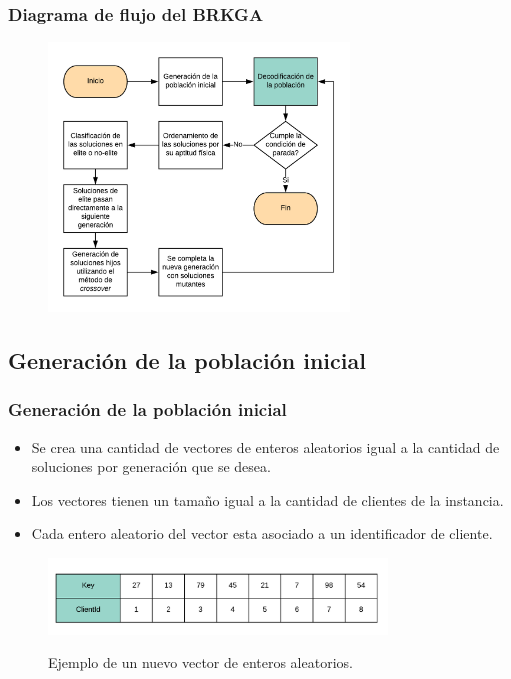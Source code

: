 \documentclass{beamer}
\begin{document}
\begin{frame}
\frametitle{Diagrama de flujo del BRKGA}

\begin{figure}[h]
	\centering
	\includegraphics[width=8cm]{BRKGA_Flow_Chart_Base}
	\label{fig:BRKGA_Flow_Chart_Base}
\end{figure}

\end{frame}


\subsection{Generación de la población inicial}

\begin{frame}
\frametitle{Generación de la población inicial}

\begin{itemize}
    \item Se crea una cantidad de vectores de enteros aleatorios igual a la cantidad de soluciones por generación que se desea.
    \pause
    \item Los vectores tienen un tamaño igual a la cantidad de clientes de la instancia.
    \pause
    \item Cada entero aleatorio del vector esta asociado a un identificador de cliente.
    \pause
\end{itemize}

\begin{figure}[h]
	\caption{Ejemplo de un nuevo vector de enteros aleatorios.}
	\centering
	\includegraphics[width=9cm]{RandomKeysInicializado}
	\label{fig:RandomKeysInicializado}
\end{figure}

\end{frame}
\end{document}
